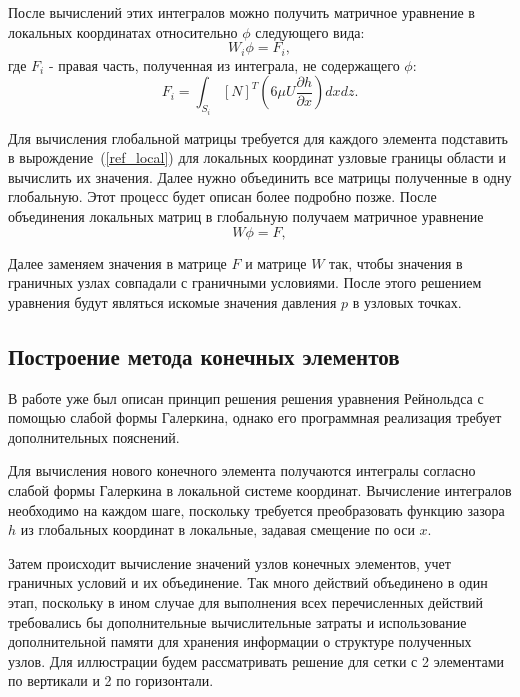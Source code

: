 \documentclass[a4paper,14pt]{extarticle}
\begin{document}
После вычислений этих интегралов можно получить матричное уравнение в локальных координатах относительно $\phi$ следующего вида:
\begin{equation}
W_i \phi = F_i,
\label{ref_local}
\end{equation}
где $F_i$ - правая часть, полученная из интеграла, не содержащего $\phi$:
\begin{equation*}
	F_i = \int_{S_i} [N]^T\left(6 \mu U \frac{\partial h}{\partial x}\right) dx dz.
\end{equation*}

Для вычисления глобальной матрицы требуется для каждого элемента подставить в вырождение~(\ref{ref_local}) для локальных координат узловые границы области и вычислить их значения. 
Далее нужно объединить все матрицы полученные в одну глобальную. Этот процесс будет описан более подробно позже.
После объединения локальных матриц в глобальную получаем матричное уравнение 
\begin{equation*}
	W \phi = F,
\end{equation*}

Далее заменяем значения в матрице $F$ и матрице $W$ так, чтобы значения в граничных узлах совпадали с граничными условиями.
После этого решением уравнения будут являться искомые значения давления $p$ в узловых точках.

\subsection{Построение метода конечных элементов}
В работе уже был описан принцип решения решения уравнения Рейнольдса с помощью слабой формы Галеркина, однако его программная реализация требует дополнительных пояснений.

Для вычисления нового конечного элемента получаются интегралы согласно слабой формы Галеркина в локальной системе координат. Вычисление интегралов необходимо на каждом шаге, поскольку требуется преобразовать функцию зазора $h$ из глобальных координат в локальные, задавая смещение по оси $x$.

Затем происходит вычисление значений узлов конечных элементов, учет граничных условий и их объединение. Так много действий объединено в один этап, поскольку в ином случае для выполнения всех перечисленных действий требовались бы дополнительные вычислительные затраты и использование дополнительной памяти для хранения информации о структуре полученных узлов. Для иллюстрации будем рассматривать решение для сетки с 2 элементами по вертикали и 2 по горизонтали.
\end{document}

